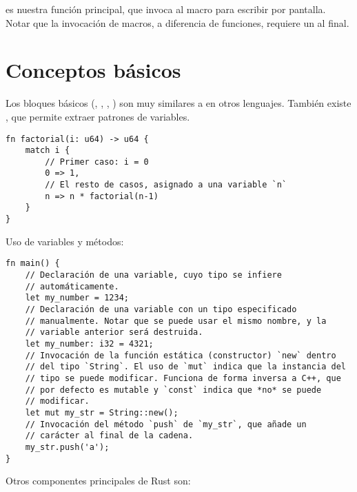  es nuestra función principal, que invoca al macro 
para escribir por pantalla. Notar que la invocación de macros, a diferencia de
funciones, requiere un \code{!} al final.

\section{Conceptos básicos}

Los bloques básicos (, , , ) son muy
similares a en otros lenguajes. También existe , que permite extraer
patrones de variables.

\begin{verbatim}
fn factorial(i: u64) -> u64 {
    match i {
        // Primer caso: i = 0
        0 => 1,
        // El resto de casos, asignado a una variable `n`
        n => n * factorial(n-1)
    }
}
\end{verbatim}

Uso de variables y métodos:

\begin{verbatim}
fn main() {
    // Declaración de una variable, cuyo tipo se infiere
    // automáticamente.
    let my_number = 1234;
    // Declaración de una variable con un tipo especificado
    // manualmente. Notar que se puede usar el mismo nombre, y la
    // variable anterior será destruida.
    let my_number: i32 = 4321;
    // Invocación de la función estática (constructor) `new` dentro
    // del tipo `String`. El uso de `mut` indica que la instancia del
    // tipo se puede modificar. Funciona de forma inversa a C++, que
    // por defecto es mutable y `const` indica que *no* se puede
    // modificar.
    let mut my_str = String::new();
    // Invocación del método `push` de `my_str`, que añade un
    // carácter al final de la cadena.
    my_str.push('a');
}
\end{verbatim}

Otros componentes principales de Rust son:

